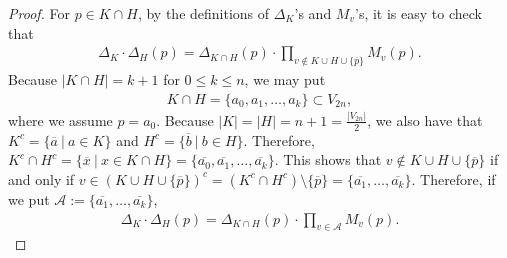 \documentclass[12pt]{amsart}
\theoremstyle{remark}
\numberwithin{equation}{section}
\begin{document}
\begin{proof}
For $p\in K\cap H$, by the definitions of $\Delta_{K}$'s and $M_{v}$'s, 
it is easy to check that 
\begin{align*}
\Delta_{K}\cdot \Delta_{H}(p)
=\Delta_{K\cap H}(p)\cdot \prod_{v\not\in K\cup H\cup \{\overline{p}\}}M_{v}(p).
\end{align*}
Because $|K\cap H|=k+1$ for $0\le k\le n$, we may put  
\begin{align*}
K\cap H=\{a_{0},a_{1},\ldots, a_{k}\}\subset V_{2n},
\end{align*}
where we assume $p=a_{0}$.
Because $|K|=|H|=n+1=\frac{|V_{2n}|}{2}$, we also have that 
$K^{c}=\{\overline{a}\ |\ a\in K\}$ and $H^{c}=\{\overline{b}\ |\ b\in H\}$.
Therefore, 
$K^{c}\cap H^{c}=\{\overline{x}\ |\ x\in K\cap H\}=\{\overline{a_{0}},\overline{a_{1}},\ldots, \overline{a_{k}}\}$.
This shows that 
$v\not\in K\cup H\cup \{\overline{p}\}$ if and only if $v\in (K\cup H\cup \{\overline{p}\})^{c}=(K^{c}\cap H^{c})\setminus \{\overline{p}\}=\{\overline{a_{1}},\ldots, \overline{a_{k}}\}$.
Therefore, if we put $\mathcal{A}:=\{\overline{a_{1}},\ldots, \overline{a_{k}}\}$, 
\begin{align}
\label{equation-for-1st-step}
\Delta_{K}\cdot \Delta_{H}(p)=\Delta_{K\cap H}(p)\cdot \prod_{v\in \mathcal{A}}M_{v}(p).

\end{align}
\end{proof}
\end{document}
